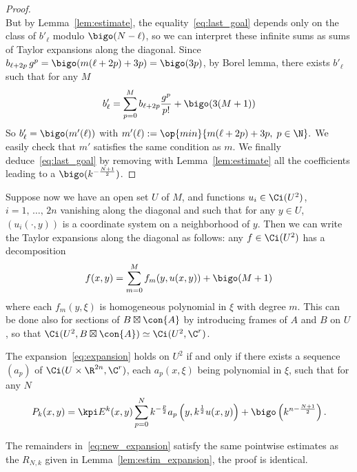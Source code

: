 \begin{proof}
\[\]
But by Lemma~\ref{lem:estimate}, the equality~\eqref{eq:last_goal} depends only on the class of $b'_{\ell}$ modulo $\bigo (N- \ell)$, so we can interpret these infinite sums as sums of Taylor expansions along the diagonal. Since $b_{\ell +2p} \, g^{p} = \bigo (m(\ell +2 p) + 3p) = \bigo (3p)$, by Borel lemma, there exists $b'_{\ell}$ such that for any $M$
\begin{gather}\label{eq:changement_E}
b'_{\ell} = \sum_{p=0}^M b_{\ell+ 2p } \frac{g^p}{p!} + \bigo (3(M+1))
\end{gather}
So $b'_{\ell} = \bigo (m '(\ell))$ with $ m' (\ell) := \op{min} \{ m(\ell + 2p) + 3p, \; p \in \N \}.$ We easily check that $m'$ satisfies the same condition as $m$. We finally deduce~\eqref{eq:last_goal} by removing with Lemma~\ref{lem:estimate} all the coefficients leading to a $\bigo (k^{-\frac{N+1}{2}})$.
\end{proof}

Suppose now we have an open set $U$ of $M$, and functions $u_i \in \Ci (U^2)$, $i =1, \,\ldots,\, 2n$ vanishing along the diagonal and such that for any $y \in U$, $(u_i(
\cdot, y))$ is a coordinate system on a neighborhood of $y$. Then we can write the Taylor expansions along the diagonal as follows: any $ f \in \Ci (U^2)$ has a decomposition
\begin{gather}\label{eq:taylor_expansion}
f(x,y) = \sum_{m=0}^M f_m (y, u(x,y)) + \bigo (M+1)
\end{gather}
where each $f_m (y,\xi)$ is homogeneous polynomial in $\xi$ with degree $m$. This can be done also for sections of $B \boxtimes \con{A}$ by introducing frames of $A$ and $B$ on $U$, so that $\Ci (U^2, B \boxtimes \con{A}) \simeq \Ci (U^2, \C^r)$.

\begin{lemm}\label{lem:new_expansion}
The expansion~\eqref{eq:expansion} holds on $U^2$ if and only if there exists a sequence $(a_p)$ of $\Ci (U \times \R^{2n}, \C^r)$, each $a_p (x,\xi)$ being polynomial in $\xi$, such that for any $N$
\begin{equation}\label{eq:new_expansion}
P_k (x,y) = \kpi E^k (x,y) \sum_{p=0}^{N} k^{-\frac{p}{2}} a_p \left(y, k^{\frac{1}{2}} u (x,y)\right) + \bigo \left(k^{n- \frac{N+1}{2}}\right).
\end{equation}
\end{lemm}

The remainders in~\eqref{eq:new_expansion} satisfy the same pointwise estimates as the $R_{N,k}$ given in Lemma~\ref{lem:estim_expansion}, the proof is identical.

